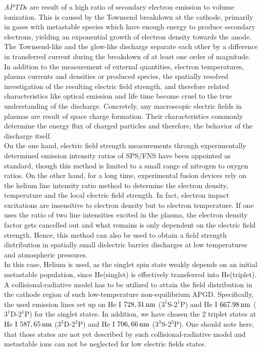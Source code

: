 \documentclass[a4paper,10pt,twoside]{article}
\newcommand{\tilt}[1]{\textit{#1}}
\begin{document}
		\tilt{APTD}s are result of a high ratio of secondary electron emission to volume ionization. This is caused by the Townsend breakdown at the cathode, primarily in gases with metastable species which have enough energy to produce secondary electrons, yielding an exponential growth of electron density towards the anode.\\
		The Townsend-like and the glow-like discharge separate each other by a difference in transferred current during the breakdown of at least one order of magnitude. In addition to the measurement of external quantities, electron temperatures, plasma currents and densities or produced species, the spatially resolved investigation of the resulting electric field strength, and therefore related characteristics like optical emission and life time become cruel to the true understanding of the discharge. Concretely, any macroscopic electric fields in plasmas are result of space charge formation. Their characteristics commonly determine the energy flux of charged particles and therefore, the behavior of the discharge itself. \\
		On the one hand, electric field strength measurements through experimentally determined emission intensity ratios of SPS/FNS have been appointed as standard, though this method is limited to a small range of nitrogen to oxygen ratios. On the other hand, for a long time, experimental fusion devices rely on the helium line intensity ratio method to determine the electron density, temperature and the local electric field strength. In fact, electron impact excitations are insensitive to electron density but to electron temperature. If one uses the ratio of two line intensities excited in the plasma, the electron density factor gets cancelled out and what remains is only dependent on the electric field strength. Hence, this method can also be used to obtain a field strength distribution in spatially small dielectric barrier discharges at low temperatures and atmospheric pressures.\\
		In this case, Helium is used, as the singlet spin state weakly depends on an initial metastable population, since He(singlet) is effectively transferred into He(triplet). A collisional-radiative model has to be utilized to attain the field distribution in the cathode region of such low-temperature non-equilibrium APGD. Specifically, the used emission lines set up on He I $\unit[728,31]{nm}$ ($3^1$S-$2^1$P) and He I $\unit[667.98]{nm}$ ($3^1$D-$2^1$P) for the singlet states. In addition, we have chosen the 2 triplet states at He I $\unit[587,65]{nm}$ ($3^3$D-$2^3$P) and He I $\unit[706,66]{nm}$ ($3^3$S-$2^3$P). One should note here, that those states are not yet described by such collisional-radiative model and metastable ions can not be neglected for low electric fields states.\\
\end{document}
